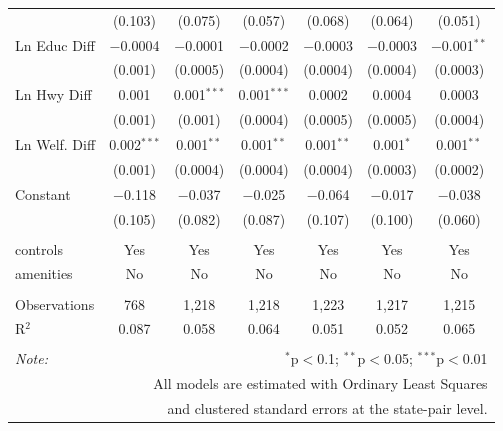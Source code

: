\begin{table}[!htbp]
\begin{tabular}{@{\extracolsep{5pt}}lcccccc}
  & (0.103) & (0.075) & (0.057) & (0.068) & (0.064) & (0.051) \\ 
  Ln Educ Diff & $-$0.0004 & $-$0.0001 & $-$0.0002 & $-$0.0003 & $-$0.0003 & $-$0.001$^{**}$ \\ 
  & (0.001) & (0.0005) & (0.0004) & (0.0004) & (0.0004) & (0.0003) \\ 
  Ln Hwy Diff & 0.001 & 0.001$^{***}$ & 0.001$^{***}$ & 0.0002 & 0.0004 & 0.0003 \\ 
  & (0.001) & (0.001) & (0.0004) & (0.0005) & (0.0005) & (0.0004) \\ 
  Ln Welf. Diff & 0.002$^{***}$ & 0.001$^{**}$ & 0.001$^{**}$ & 0.001$^{**}$ & 0.001$^{*}$ & 0.001$^{**}$ \\ 
  & (0.001) & (0.0004) & (0.0004) & (0.0004) & (0.0003) & (0.0002) \\ 
  Constant & $-$0.118 & $-$0.037 & $-$0.025 & $-$0.064 & $-$0.017 & $-$0.038 \\ 
  & (0.105) & (0.082) & (0.087) & (0.107) & (0.100) & (0.060) \\ 
 \hline \\[-1.8ex] 
controls & Yes & Yes & Yes & Yes & Yes & Yes \\ 
amenities & No & No & No & No & No & No \\ 
\hline \\[-1.8ex] 
Observations & 768 & 1,218 & 1,218 & 1,223 & 1,217 & 1,215 \\ 
R$^{2}$ & 0.087 & 0.058 & 0.064 & 0.051 & 0.052 & 0.065 \\ 
\hline 
\hline \\[-1.8ex] 
\textit{Note:}  & \multicolumn{6}{r}{$^{*}$p$<$0.1; $^{**}$p$<$0.05; $^{***}$p$<$0.01} \\ 
 & \multicolumn{6}{r}{All models are estimated with Ordinary Least Squares} \\ 
 & \multicolumn{6}{r}{and clustered standard errors at the state-pair level.} \\ 
\end{tabular} 
\end{table} 
